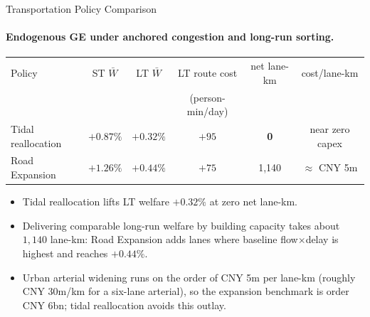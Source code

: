\documentclass[11pt,aspectratio=169]{beamer}
\newcommand{\good}[1]{\textcolor{blue!70!black}{#1}}
\newcommand{\app}[1]{\allowbreak\hspace{0.25em}\hyperlink{#1}{\beamergotobutton{details}}}
\begin{document}
\begin{frame}[label=result4]{Transportation Policy Comparison}
\framesubtitle{Endogenous GE under anchored congestion and long-run sorting.}
\begin{center}\scriptsize
\begin{tabular}{lccccc}
\toprule
Policy & ST $\bar W$ & LT $\bar W$ & LT route cost & net lane-km & cost/lane-km \\
 &  &  & (person-min/day) &  &  \\
\midrule
Tidal reallocation & $+0.87\%$ & $+0.32\%$ & $+95$ & \good{\textbf{0}} & near zero capex \\
Road Expansion & $+1.26\%$ & $+0.44\%$ & $+75$ & 1{,}140 & $\approx$ CNY 5m \\
\bottomrule
\end{tabular}
\end{center}
\vspace{0.3em}
\begin{itemize}\footnotesize
  \item Tidal reallocation lifts LT welfare $+0.32\%$ at zero net lane-km.
  \item Delivering comparable long-run welfare by building capacity takes about $1{,}140$ lane-km: Road Expansion adds lanes where baseline flow$\times$delay is highest and reaches $+0.44\%$.
  \item Urban arterial widening runs on the order of CNY 5m per lane-km (roughly CNY 30m/km for a six-lane arterial), so the expansion benchmark is order CNY 6bn; tidal reallocation avoids this outlay. \app{apppolicy}
\end{itemize}
\end{frame}
\end{document}
